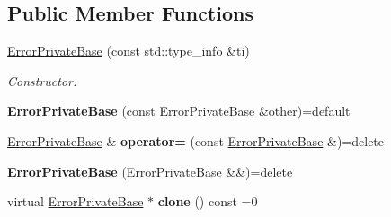 \subsection*{Public Member Functions}
\begin{DoxyCompactItemize}
\item 
\hyperlink{struct_mdt_1_1_error_private_base_a9c56872835666228e16e25c320914b95}{Error\+Private\+Base} (const std\+::type\+\_\+info \&ti)
\begin{DoxyCompactList}\small\item\em Constructor. \end{DoxyCompactList}\item 
{\bfseries Error\+Private\+Base} (const \hyperlink{struct_mdt_1_1_error_private_base}{Error\+Private\+Base} \&other)=default\hypertarget{struct_mdt_1_1_error_private_base_a99e9a3206dbbd651f59cc7a9ac3fafcd}{}\label{struct_mdt_1_1_error_private_base_a99e9a3206dbbd651f59cc7a9ac3fafcd}

\item 
\hyperlink{struct_mdt_1_1_error_private_base}{Error\+Private\+Base} \& {\bfseries operator=} (const \hyperlink{struct_mdt_1_1_error_private_base}{Error\+Private\+Base} \&)=delete\hypertarget{struct_mdt_1_1_error_private_base_a42d145fc08ca241cdaafec1ef16d52df}{}\label{struct_mdt_1_1_error_private_base_a42d145fc08ca241cdaafec1ef16d52df}

\item 
{\bfseries Error\+Private\+Base} (\hyperlink{struct_mdt_1_1_error_private_base}{Error\+Private\+Base} \&\&)=delete\hypertarget{struct_mdt_1_1_error_private_base_ad1f98f8d45b815858425423ad4108e35}{}\label{struct_mdt_1_1_error_private_base_ad1f98f8d45b815858425423ad4108e35}

\item 
virtual \hyperlink{struct_mdt_1_1_error_private_base}{Error\+Private\+Base} $\ast$ {\bfseries clone} () const =0\hypertarget{struct_mdt_1_1_error_private_base_afca32564ec7cae7463e8e23560d0917d}{}\label{struct_mdt_1_1_error_private_base_afca32564ec7cae7463e8e23560d0917d}

\end{DoxyCompactItemize}
